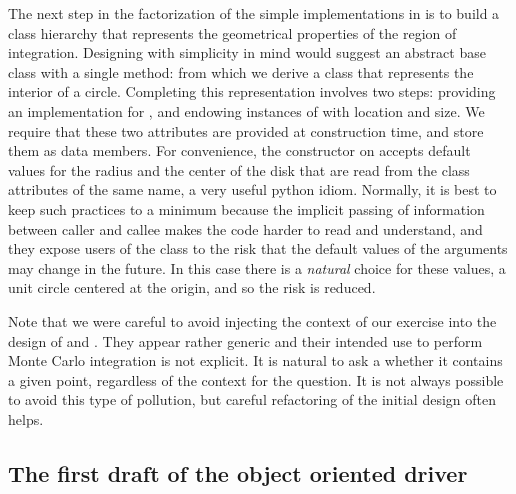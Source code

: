 The next step in the factorization of the simple implementations in  is to build
a class hierarchy that represents the geometrical properties of the region of integration.
Designing with simplicity in mind would suggest an abstract base class  with a
single method:
%
%
from which we derive a class  that represents the interior of a circle.  Completing
this representation involves two steps: providing an implementation for , and
endowing instances of  with location and size. We require that these two attributes
are provided at construction time, and store them as data members.
%
%
For convenience, the constructor on  accepts default values for
the radius and the center of the disk that are read from the class attributes of the same name,
a very useful python idiom. Normally, it is best to keep such practices to a minimum because
the implicit passing of information between caller and callee makes the code harder to read and
understand, and they expose users of the class  to the risk that the default values
of the arguments may change in the future. In this case there is a {\em natural} choice for
these values, a unit circle centered at the origin, and so the risk is reduced.

Note that we were careful to avoid injecting the context of our exercise into the design of
 and . They appear rather generic and their intended use to perform
Monte Carlo integration is not explicit. It is natural to ask a  whether it
contains a given point, regardless of the context for the question. It is not always possible
to avoid this type of pollution, but careful refactoring of the initial design often helps.

\subsection{The first draft of the object oriented driver}
\label{sec:classes:driver:draft}

